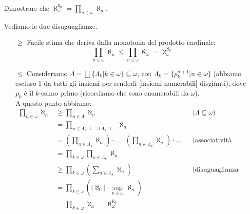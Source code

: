 \begin{exercise}
	Dimostrare che $\aleph_\omega^{\aleph_0} = \prod_{n \in \omega} \aleph_n$.
\end{exercise}

\begin{soln}
	Vediamo le due disuguaglianze.
	\begin{itemize}
		\item[$\boxed{\geq}$] Facile stima che deriva dalla monotonia del prodotto cardinale:
		\[ \prod_{n \in \omega} \aleph_n \leq \prod_{n \in \omega} \aleph_\omega = \aleph_\omega^{\aleph_0}
			\]
		\item[$\boxed{\leq}$] Consideriamo $\Lambda = \bigsqcup \{\Lambda_k | k \in \omega\} \subseteq \omega$, con $\Lambda_k = \{p_k^{n+1} | n \in \omega\}$ (abbiamo escluso 1 da tutti gli insiemi per renderli [insiemi numerabili] disgiunti), dove $p_k$ è il $k$-esimo primo (ricordiamo che sono enumerabili da $\omega$).\\
		A questo punto abbiamo:
		\begin{align*}
			\prod_{n \in \omega} \aleph_n &\geq \prod_{n \in \Lambda} \aleph_n &&\text{($\Lambda \subseteq \omega$)} \\
			&= \prod_{n \in \Lambda_1 \sqcup \ldots \sqcup \Lambda_k \sqcup \ldots} \aleph_n \\
			&= \left(\prod_{n \in \Lambda_1}\aleph_n\right)\cdot\ldots\cdot\left(\prod_{n \in \Lambda_k}\aleph_n\right)\cdot\ldots &&\text{(associatività infinita)} \\
			&=\prod_{k \in \omega}\prod_{n \in \Lambda_k}\aleph_n \\
			&\geq \prod_{k \in \omega}\left(\sum_{n \in \Lambda_k}\aleph_n\right) &&\text{(disuguaglianza somma-prodotto)} \\
			&= \prod_{k \in \omega}\left(|\aleph_0| \cdot \sup_{n \in \omega}\aleph_n\right) \\
			&= \prod_{k \in \omega}\aleph_\omega = \aleph_\omega^{\aleph_0}
		\end{align*}
	\end{itemize}
\end{soln}

